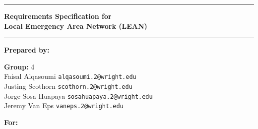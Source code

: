 \documentclass[12pt]{article}
\begin{document}
	\begin{titlepage}
		\hrule
		\begin{center}
			{\LARGE {\bf Requirements Specification for \\Local Emergency Area Network (LEAN)}}
		\end{center}
		\hrule
		\vspace{1in}
		\noindent
		{\LARGE{\bf Prepared by:}}\\
		\vspace{0.5in}
		
		\noindent
		{\large\textbf{Group:} 4}\\
		
		\noindent
		Faisal Alqasoumi \hfill \verb|alqasoumi.2@wright.edu|\\
		Justing Scothorn \hfill \verb|scothorn.2@wright.edu|\\
		Jorge Sosa Huapaya \hfill \verb|sosahuapaya.2@wright.edu|\\
		Jeremy Van Eps \hfill \verb|vaneps.2@wright.edu|\\
		\vspace{0.5in}
		
		\noindent
		{\LARGE{\bf For:}}\\
		
		\noindent
		
	\end{titlepage}
\end{document}
